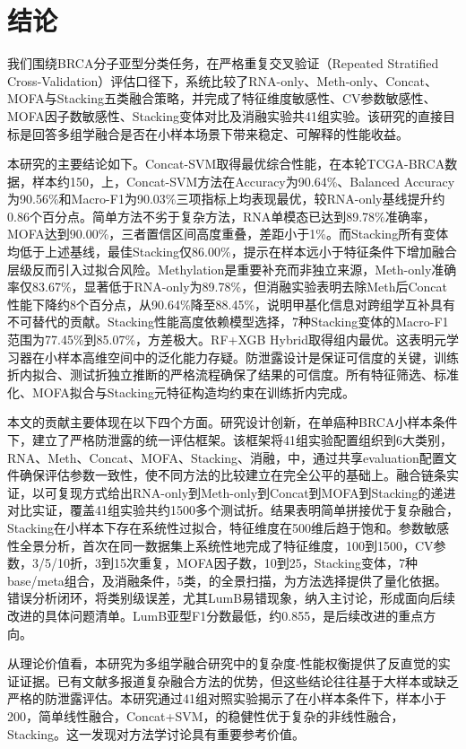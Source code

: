 
\section{结论}

我们围绕BRCA分子亚型分类任务，在严格重复交叉验证（Repeated Stratified Cross-Validation）评估口径下，系统比较了RNA-only、Meth-only、Concat、MOFA与Stacking五类融合策略，并完成了特征维度敏感性、CV参数敏感性、MOFA因子数敏感性、Stacking变体对比及消融实验共41组实验。该研究的直接目标是回答多组学融合是否在小样本场景下带来稳定、可解释的性能收益。

本研究的主要结论如下。Concat-SVM取得最优综合性能，在本轮TCGA-BRCA数据，样本约150，上，Concat-SVM方法在Accuracy为90.64\%、Balanced Accuracy为90.56\%和Macro-F1为90.03\%三项指标上均表现最优，较RNA-only基线提升约0.86个百分点。简单方法不劣于复杂方法，RNA单模态已达到89.78\%准确率，MOFA达到90.00\%，三者置信区间高度重叠，差距小于1\%。而Stacking所有变体均低于上述基线，最佳Stacking仅86.00\%，提示在样本远小于特征条件下增加融合层级反而引入过拟合风险。Methylation是重要补充而非独立来源，Meth-only准确率仅83.67\%，显著低于RNA-only为89.78\%，但消融实验表明去除Meth后Concat性能下降约8个百分点，从90.64\%降至88.45\%，说明甲基化信息对跨组学互补具有不可替代的贡献。Stacking性能高度依赖模型选择，7种Stacking变体的Macro-F1范围为77.45\%到85.07\%，方差极大。RF+XGB Hybrid取得组内最优。这表明元学习器在小样本高维空间中的泛化能力存疑。防泄露设计是保证可信度的关键，训练折内拟合、测试折独立推断的严格流程确保了结果的可信度。所有特征筛选、标准化、MOFA拟合与Stacking元特征构造均约束在训练折内完成。

本文的贡献主要体现在以下四个方面。研究设计创新，在单癌种BRCA小样本条件下，建立了严格防泄露的统一评估框架。该框架将41组实验配置组织到6大类别，RNA、Meth、Concat、MOFA、Stacking、消融，中，通过共享evaluation配置文件确保评估参数一致性，使不同方法的比较建立在完全公平的基础上。融合链条实证，以可复现方式给出RNA-only到Meth-only到Concat到MOFA到Stacking的递进对比实证，覆盖41组实验共约1500多个测试折。结果表明简单拼接优于复杂融合，Stacking在小样本下存在系统性过拟合，特征维度在500维后趋于饱和。参数敏感性全景分析，首次在同一数据集上系统性地完成了特征维度，100到1500，CV参数，3/5/10折，3到15次重复，MOFA因子数，10到25，Stacking变体，7种base/meta组合，及消融条件，5类，的全景扫描，为方法选择提供了量化依据。错误分析闭环，将类别级误差，尤其LumB易错现象，纳入主讨论，形成面向后续改进的具体问题清单。LumB亚型F1分数最低，约0.855，是后续改进的重点方向。

从理论价值看，本研究为多组学融合研究中的复杂度-性能权衡提供了反直觉的实证证据。已有文献多报道复杂融合方法的优势，但这些结论往往基于大样本或缺乏严格的防泄露评估。本研究通过41组对照实验揭示了在小样本条件下，样本小于200，简单线性融合，Concat+SVM，的稳健性优于复杂的非线性融合，Stacking。这一发现对方法学讨论具有重要参考价值。

